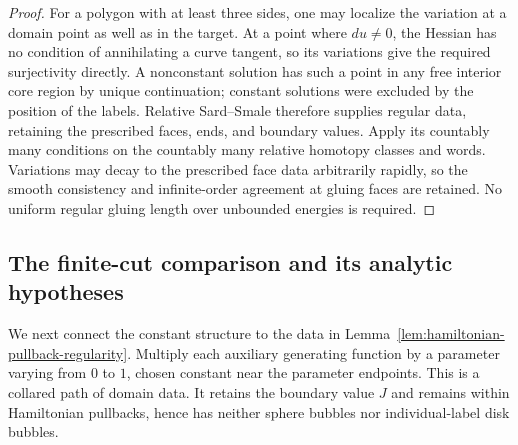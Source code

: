 \documentclass[11pt]{article}
\numberwithin{equation}{section}
\theoremstyle{definition}
\theoremstyle{remark}
\begin{document}
\begin{proof}
For a polygon with at least three sides, one may localize the
variation at a domain point as well as in the target.  At a point
where $du\ne0$, the Hessian has no condition of annihilating a
curve tangent, so its variations give the required surjectivity
directly.  A nonconstant solution has such a point in any free
interior core region by unique continuation; constant solutions
were excluded by the position of the labels.  Relative Sard--Smale
therefore supplies regular data, retaining the prescribed faces,
ends, and boundary values.  Apply its countably many conditions
on the countably many relative homotopy classes and words.
Variations may decay to the prescribed face data arbitrarily
rapidly, so the smooth consistency and infinite-order agreement
at gluing faces are retained.  No uniform regular gluing length
over unbounded energies is required.
\end{proof}

\subsection{The finite-cut comparison and its analytic hypotheses}

We next connect the constant structure to the data in
Lemma~\ref{lem:hamiltonian-pullback-regularity}.  Multiply each
auxiliary generating function by a parameter varying from $0$ to
$1$, chosen constant near the parameter endpoints.  This is a
collared path of domain data.  It retains the boundary value $J$
and remains within Hamiltonian pullbacks, hence has neither
sphere bubbles nor individual-label disk bubbles.
\end{document}
